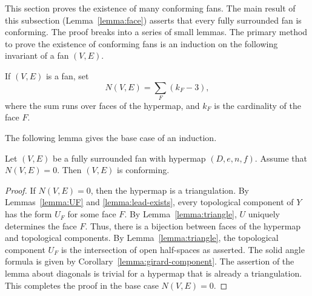 This section proves the existence of many conforming fans.  The main result
of this subsection
(Lemma~\ref{lemma:face}) asserts that every fully surrounded fan is conforming.  The
proof breaks into a series of small lemmas.  The primary
method to prove the existence of conforming fans is an induction on
the following invariant of a fan $(V,E)$.

\begin{definition}[$N(V,E)$]
If $(V,E)$ is a fan,  set
\begin{displaymath}
N(V,E) = \sum_F (k_F - 3),
\end{displaymath}
where the sum runs over faces of the hypermap, and $k_F$ is the
cardinality of the face $F$.
\end{definition}

The following lemma gives the base case of an induction.

\begin{lemma}[]\label{lemma:N=0}
Let $(V,E)$ be a fully surrounded fan with hypermap $(D,e,n,f)$. 
Assume that $N(V,E)=0$.
Then $(V,E)$ is conforming.
\end{lemma}
%
%
%

\begin{proof}
If $N(V,E)=0$, then the hypermap is a triangulation.  By
Lemmas~\ref{lemma:UF} and \ref{lemma:lead-exists}, every topological
component of $Y$ has the form $U_F$ for some face $F$.  By
Lemma~\ref{lemma:triangle}, $U$ uniquely determines the face $F$.
Thus, there is a bijection between faces of the hypermap and
topological components.  By Lemma~\ref{lemma:triangle}, the
topological component $U_F$ is the intersection of open half-spaces
as asserted.  The solid angle formula is given by
Corollary~\ref{lemma:girard-component}.  The assertion of the lemma
about diagonals
is trivial for a hypermap that is already a triangulation. This
completes the proof in the base case $N(V,E)=0$.
\end{proof}

